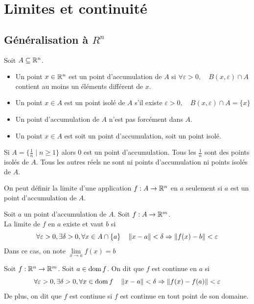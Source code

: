 \chapter{Limites et continuité}
\section{Généralisation à $R^n$}
Soit $A\subseteq\mathbb{R}^n$.
\begin{definition}
    \begin{itemize}
        \item Un point $x\in \mathbb{R}^n$ est un point d'accumulation de $A$ si $\forall\varepsilon>0, \quad B(x,\varepsilon)\cap A$ contient au moins un éléments différent de $x$.
        \item Un point $x\in A$ est un point isolé de $A$ s'il existe $\varepsilon>0, \quad B(x,\varepsilon)\cap A = \{x\}$
    \end{itemize}
\end{definition}
    \begin{remarque}
        \begin{itemize}
            \item Un point d'accumulation de $A$ n'est pas forcément dans $A$.
            \item Un point $x\in A$ est soit un point d'accumulation, soit un point isolé.
        \end{itemize}
    \end{remarque}
    \begin{exemple}
        Si $A=\{\frac{1}{n}\mid n\geq 1\}$ alors $0$ est un point d'accumulation. Tous les $\frac{1}{n}$ sont des points isolés de $A$. Tous les autres réels ne sont ni points d'accumulation ni points isolés de $A$.
    \end{exemple}
    On peut définir la limite d'une application $f:A\to\mathbb{R}^n$ en $a$ seulement si $a$ est un point d'accumulation de $A$.
    \begin{definition}
        Soit $a$ un point d'accumulation de $A$. Soit $f:A\to\mathbb{R}^m$.\\
        La limite de $f$ en $a$ existe et vaut $b$ si 
        \[
        \forall\varepsilon>0, \exists\delta>0, \forall x\in A\cap \{a\} \quad \left\| x-a \right\|<\delta \Rightarrow \left\| f(x)-b \right\|<\varepsilon 
        \]
        Dans ce cas, on note $\lim\limits_{x\to a}f(x)=b$
    \end{definition}
    \begin{definition}
        Soit $f:\mathbb{R}^n\to \mathbb{R}^m$. Soit $a\in \operatorname{dom} f$. On dit que $f$ est continue en $a$ si
        \[
        \forall \varepsilon>0,\exists\delta>0,\forall x\in \operatorname{dom} f \quad \left\| x-a \right\|<\delta \Rightarrow \left\| f(x)-f(a) \right\|<\varepsilon
        \]
        De plus, on dit que $f$ est continue si $f$ est continue en tout point de son domaine.
    \end{definition}
